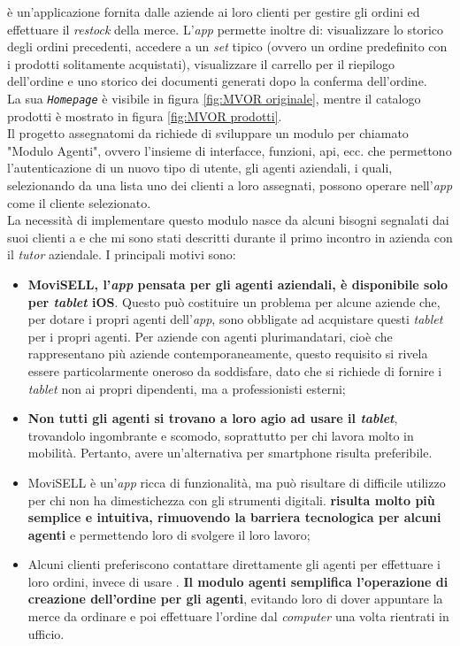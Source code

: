 {\movi} è un'applicazione fornita dalle aziende ai loro clienti per gestire gli ordini ed effettuare il \textit{restock} della merce. 
L'\textit{app} permette inoltre di: visualizzare lo 
storico degli ordini precedenti, accedere a un \textit{set} tipico (ovvero un ordine predefinito con i prodotti solitamente 
acquistati), visualizzare il carrello per il riepilogo dell'ordine e uno storico dei 
documenti generati dopo la conferma dell'ordine.\\
La sua 
\textit{\texttt{Homepage}} è visibile in figura \ref{fig:MVOR originale}, mentre il catalogo prodotti è mostrato in figura 
\ref{fig:MVOR prodotti}.\\
Il progetto assegnatomi da {\company} richiede di sviluppare un modulo per {\movi} chiamato "Modulo Agenti", ovvero 
l'insieme di interfacce, funzioni, \gls{api}, ecc. che permettono l'autenticazione di un nuovo tipo di utente, gli agenti aziendali, 
i quali, selezionando da una lista uno dei clienti a loro assegnati, possono operare nell'\textit{app} come il cliente selezionato.\\
La necessità di implementare questo modulo nasce da alcuni bisogni segnalati dai suoi clienti a {\company} e che 
mi sono stati descritti durante il primo incontro in azienda con il \textit{tutor} aziendale. I principali motivi sono:
\begin{itemize}
    \item \textbf{MoviSELL, l'\textit{app} pensata per gli agenti aziendali, è disponibile solo per \textit{tablet} iOS}. Questo può costituire un problema 
          per alcune aziende che, per dotare i propri agenti dell'\textit{app}, sono obbligate ad acquistare questi \textit{tablet} per i propri agenti. 
          Per aziende con agenti plurimandatari, cioè che rappresentano più aziende contemporaneamente, questo requisito si 
          rivela essere particolarmente oneroso da soddisfare, dato che si richiede di fornire i \textit{tablet} non ai propri dipendenti, 
          ma a professionisti esterni;
    \item \textbf{Non tutti gli agenti si trovano a loro agio ad usare il \textit{tablet}}, trovandolo ingombrante e scomodo, soprattutto per chi 
          lavora molto in mobilità. Pertanto, avere un'alternativa per smartphone risulta preferibile.
    \item MoviSELL è un'\textit{app} ricca di funzionalità, ma può risultare di difficile utilizzo per chi non ha dimestichezza con gli 
          strumenti digitali. \textbf{{\movi} risulta molto più semplice e intuitiva, rimuovendo la barriera tecnologica per alcuni 
          agenti} e permettendo loro di svolgere il loro lavoro;
    \item Alcuni clienti preferiscono contattare direttamente gli agenti per effettuare i loro ordini, invece di usare {\movi}. 
          \textbf{Il modulo agenti semplifica l'operazione di creazione dell'ordine per gli agenti}, evitando loro di dover appuntare 
          la merce da ordinare e poi effettuare l'ordine dal \textit{computer} una volta rientrati in ufficio.
\end{itemize}